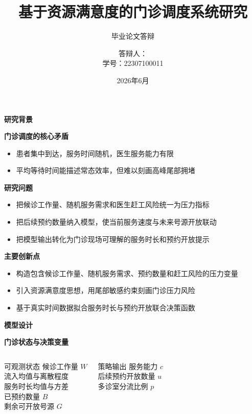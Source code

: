 \documentclass[aspectratio=169,UTF8,zihao=-4]{ctexbeamer}
\title{基于资源满意度的门诊调度系统研究}
\subtitle{毕业论文答辩}
\author{\texorpdfstring{答辩人：\studentname\\学号：22307100011}{答辩人：\studentnameplain，学号：22307100011}}
\date{2026年6月}
\newcommand{\bigidea}[1]{
  \begin{center}
    \vspace{0.8em}
    {\LARGE \bfseries #1}
    \vspace{0.6em}
  \end{center}
}
\newcommand{\sectionpageframe}[1]{
  \begin{frame}[plain]
    \begin{center}
      \vfill
      {\Huge \bfseries #1}
      \vfill
    \end{center}
  \end{frame}
}
\begin{document}
\begin{frame}[plain]
  \titlepage
\end{frame}

\sectionpageframe{研究背景}

\begin{frame}
  \bigidea{门诊调度的核心矛盾}
  \begin{itemize}
    \item \Large 患者集中到达，服务时间随机，医生服务能力有限
    \item \Large 平均等待时间能描述常态效率，但难以刻画高峰尾部拥堵
  \end{itemize}
\end{frame}

\begin{frame}
  \bigidea{研究问题}
  \begin{itemize}
    \item \Large 把候诊工作量、随机服务需求和医生赶工风险统一为压力指标
    \item \Large 把后续预约数量纳入模型，使当前服务速度与未来号源开放联动
    \item \Large 把模型输出转化为门诊现场可理解的服务时长和预约开放提示
  \end{itemize}
\end{frame}

\begin{frame}
  \bigidea{主要创新点}
  \begin{itemize}
    \item \Large 构造包含候诊工作量、随机服务需求、预约数量和赶工风险的压力变量
    \item \Large 引入资源满意度思想，用尾部敏感约束刻画门诊压力风险
    \item \Large 基于真实时间数据拟合服务时长与预约开放联合决策函数
  \end{itemize}
\end{frame}

\sectionpageframe{模型设计}

\begin{frame}
  \bigidea{门诊状态与决策变量}
  \begin{columns}[T]
    \begin{block}{可观测状态}
      \Large
      候诊工作量 $W$\\
      流入均值与离散程度\\
      服务时长均值与方差\\
      已预约数量 $B$\\
      剩余可开放号源 $G$
    \end{block}
    \begin{block}{策略输出}
      \Large
      服务能力 $c$\\
      后续预约开放数量 $u$\\
      多诊室分流比例 $p$
    \end{block}
  \end{columns}
\end{frame}
\end{document}
